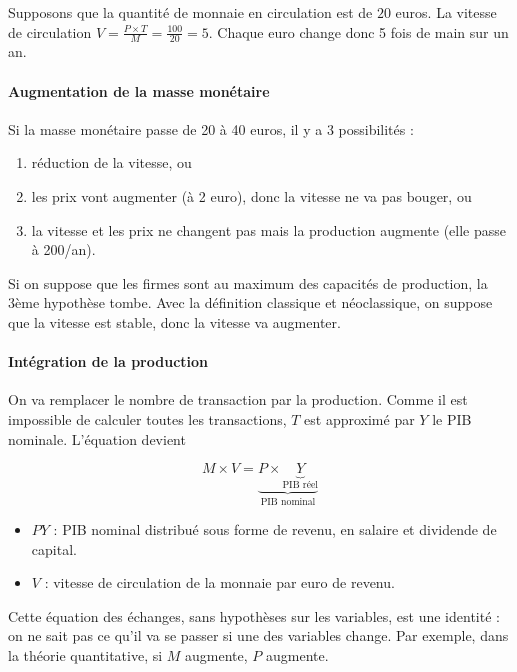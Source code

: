 	Supposons que la quantité de monnaie en circulation est de $20$ euros. La vitesse de circulation $V = \frac{P \times T}{M} = \frac{100}{20} = 5$. Chaque euro change donc 5 fois de main sur un an.
	
	\paragraph{Augmentation de la masse monétaire}
	
	Si la masse monétaire passe de 20 à 40 euros, il y a 3 possibilités :
	
	\begin{enumerate}
		\item réduction de la vitesse, ou
		\item les prix vont augmenter (à 2 euro), donc la vitesse ne va pas bouger, ou
		\item la vitesse et les prix ne changent pas mais la production augmente (elle passe à 200/an).
	\end{enumerate}
	
	Si on suppose que les firmes sont au maximum des capacités de production, la 3ème hypothèse tombe. Avec la définition classique et néoclassique, on suppose que la vitesse est stable, donc la vitesse va augmenter.
	
	\paragraph{Intégration de la production}
		
	On va remplacer le nombre de transaction par la production. Comme il est impossible de calculer toutes les transactions, $T$ est approximé par $Y$ le PIB nominale. L'équation devient
	
	$$M \times V = \underbrace{P \times \underbrace{Y}_{\text{PIB réel}}}_{\text{PIB nominal}}$$
	
	\begin{itemize}
		\item $PY$ : PIB nominal distribué sous forme de revenu, en salaire et dividende de capital.
		\item $V$ : vitesse de circulation de la monnaie par euro de revenu.
	\end{itemize}
	
	Cette équation des échanges, sans hypothèses sur les variables, est une identité : on ne sait pas ce qu'il va se passer si une des variables change. Par exemple, dans la théorie quantitative, si $M$ augmente, $P$ augmente.
		
